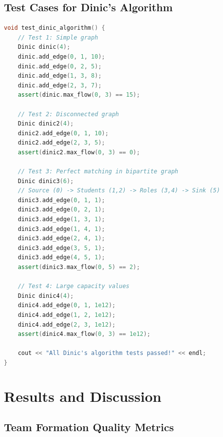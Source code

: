 \documentclass[12pt,a4paper]{article}
\begin{document}
\subsection{Test Cases for Dinic's Algorithm}

\begin{lstlisting}[language=C++, caption=Unit Tests for Dinic's Algorithm]
void test_dinic_algorithm() {
    // Test 1: Simple graph
    Dinic dinic(4);
    dinic.add_edge(0, 1, 10);
    dinic.add_edge(0, 2, 5);
    dinic.add_edge(1, 3, 8);
    dinic.add_edge(2, 3, 7);
    assert(dinic.max_flow(0, 3) == 15);
    
    // Test 2: Disconnected graph
    Dinic dinic2(4);
    dinic2.add_edge(0, 1, 10);
    dinic2.add_edge(2, 3, 5);
    assert(dinic2.max_flow(0, 3) == 0);
    
    // Test 3: Perfect matching in bipartite graph
    Dinic dinic3(6);
    // Source (0) -> Students (1,2) -> Roles (3,4) -> Sink (5)
    dinic3.add_edge(0, 1, 1);
    dinic3.add_edge(0, 2, 1);
    dinic3.add_edge(1, 3, 1);
    dinic3.add_edge(1, 4, 1);
    dinic3.add_edge(2, 4, 1);
    dinic3.add_edge(3, 5, 1);
    dinic3.add_edge(4, 5, 1);
    assert(dinic3.max_flow(0, 5) == 2);
    
    // Test 4: Large capacity values
    Dinic dinic4(4);
    dinic4.add_edge(0, 1, 1e12);
    dinic4.add_edge(1, 2, 1e12);
    dinic4.add_edge(2, 3, 1e12);
    assert(dinic4.max_flow(0, 3) == 1e12);
    
    cout << "All Dinic's algorithm tests passed!" << endl;
}
\end{lstlisting}

\section{Results and Discussion}

\subsection{Team Formation Quality Metrics}
\end{document}
